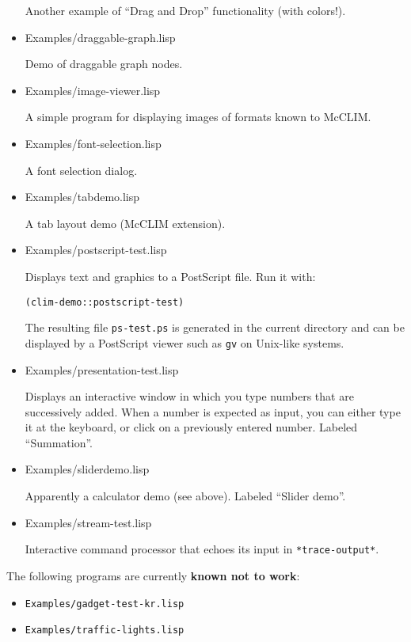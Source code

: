 \begin{itemize}
  Another example of ``Drag and Drop'' functionality (with colors!).

\item Examples/draggable-graph.lisp

  Demo of draggable graph nodes.

\item Examples/image-viewer.lisp

  A simple program for displaying images of formats known to McCLIM.

\item Examples/font-selection.lisp

  A font selection dialog.

\item Examples/tabdemo.lisp

  A tab layout demo (McCLIM extension).

\item Examples/postscript-test.lisp

  Displays text and graphics to a PostScript file.  Run it with:

\begin{verbatim}
(clim-demo::postscript-test)
\end{verbatim}

  The resulting file \texttt{ps-test.ps} is generated in the current
  directory and can be displayed by a PostScript viewer such as
  \texttt{gv} on Unix-like systems.

\item Examples/presentation-test.lisp

  Displays an interactive window in which you type numbers that are
  successively added.  When a number is expected as input, you can
  either type it at the keyboard, or click on a previously entered
  number. Labeled ``Summation''.

\item Examples/sliderdemo.lisp

  Apparently a calculator demo (see above). Labeled ``Slider demo''.

\item Examples/stream-test.lisp

  Interactive command processor that echoes its input in
  \texttt{*trace-output*}.

\end{itemize}

The following programs are currently \textbf{known not to work}:
\begin{itemize}
\item
 \texttt{Examples/gadget-test-kr.lisp}
\item
 \texttt{Examples/traffic-lights.lisp}
\end{itemize}

